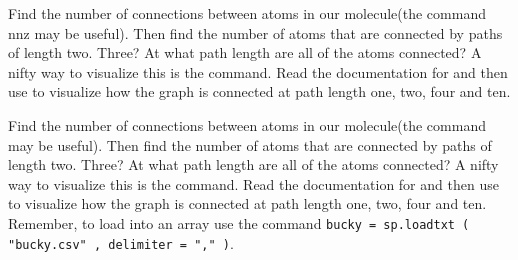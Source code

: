 \begin{problem}
\begin{matlab}
 Find the number of connections between atoms in our molecule(the command nnz may be useful). Then find the number of atoms that are connected by paths of length two. Three? At what path length are all of the atoms connected?
A nifty way to visualize this is the  command. Read the documentation for  and then use  to visualize how the graph is connected at path length one, two, four and ten.
\end{matlab}
\begin{python}
Find the number of connections between atoms in our molecule(the command  may be useful). Then find the number of atoms that are connected by paths of length two. Three? At what path length are all of the atoms connected?
A nifty way to visualize this is the  command. Read the documentation for  and then use  to visualize how the graph is connected at path length one, two, four and ten. Remember, to load  into an array use the command \lstinline{bucky = sp.loadtxt ( "bucky.csv" , delimiter = "," )}.
\end{python}
\end{problem}
